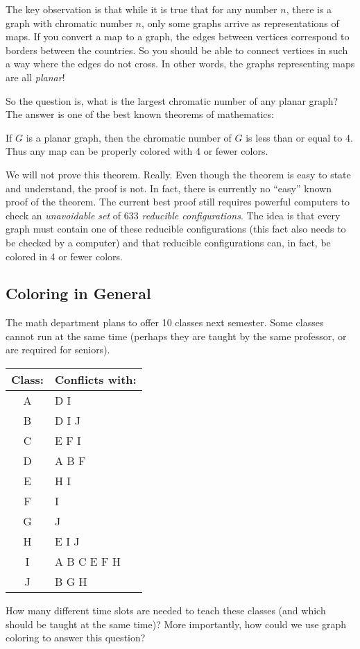 \documentclass[12pt]{article}
\begin{document}
The key observation is that while it is true that for any number $n$, there is a graph with chromatic number $n$, only some graphs arrive as representations of maps.  If you convert a map to a graph, the edges between vertices correspond to borders between the countries.  So you should be able to connect vertices in such a way where the edges do not cross.  In other words, the graphs representing maps are all {\em planar}!

So the question is, what is the largest chromatic number of any planar graph?  The answer is one of the best known theorems of mathematics:

\begin{theorem}
If $G$ is a planar graph, then the chromatic number of $G$ is less than or equal to 4.  Thus any map can be properly colored with 4 or fewer colors.
\end{theorem}

We will not prove this theorem.  Really.  Even though the theorem is easy to state and understand, the proof is not.  In fact, there is currently no ``easy'' known proof of the theorem.  The current best proof still requires powerful computers to check an {\em unavoidable set} of  633 {\em reducible configurations}.  The idea is that every graph must contain one of these reducible configurations (this fact also needs to be checked by a computer) and that reducible configurations can, in fact, be colored in 4 or fewer colors.


\subsection{Coloring in General}
\begin{activity}
The math department plans to offer 10 classes next semester.  Some classes cannot run at the same time (perhaps they are taught by the same professor, or are required for seniors).

\begin{center}
\begin{tabular}{cl}
\textbf{Class:} & \textbf{Conflicts with:} \\ \hline
A & D I \\
B & D I J \\
C & E F I \\
D & A B F \\
E & H I\\
F & I\\
G & J \\
H & E I J\\
I & A B C E F H \\
J & B G H
\end{tabular}
\end{center}

How many different time slots are needed to teach these classes (and which should be taught at the same time)?  More importantly, how could we use graph coloring to answer this question?
\end{activity}
\end{document}
